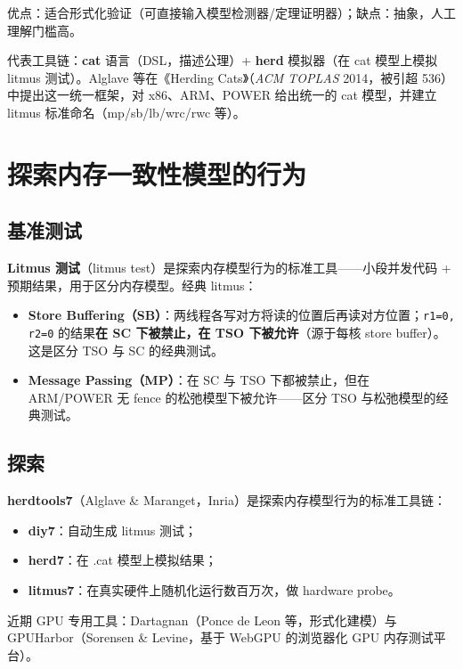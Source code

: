 优点：适合形式化验证（可直接输入模型检测器/定理证明器）；缺点：抽象，人工理解门槛高。

代表工具链：\textbf{cat} 语言（DSL，描述公理）+ \textbf{herd} 模拟器（在 cat 模型上模拟 litmus 测试）。Alglave 等在《Herding Cats》（\emph{ACM TOPLAS} 2014，被引超 536）中提出这一统一框架，对 x86、ARM、POWER 给出统一的 cat 模型，并建立 litmus 标准命名（mp/sb/lb/wrc/rwc 等）。

\section{探索内存一致性模型的行为}

\subsection{基准测试}

\textbf{Litmus 测试}（litmus test）是探索内存模型行为的标准工具——小段并发代码 + 预期结果，用于区分内存模型。经典 litmus：

\begin{itemize}
\item \textbf{Store Buffering（SB）}：两线程各写对方将读的位置后再读对方位置；\texttt{r1=0, r2=0} 的结果\textbf{在 SC 下被禁止，在 TSO 下被允许}（源于每核 store buffer）。这是区分 TSO 与 SC 的经典测试。
\item \textbf{Message Passing（MP）}：在 SC 与 TSO 下都被禁止，但在 ARM/POWER 无 fence 的松弛模型下被允许——区分 TSO 与松弛模型的经典测试。
\end{itemize}


\subsection{探索}

\textbf{herdtools7}（Alglave \& Maranget，Inria）是探索内存模型行为的标准工具链：

\begin{itemize}
\item \textbf{diy7}：自动生成 litmus 测试；
\item \textbf{herd7}：在 .cat 模型上模拟结果；
\item \textbf{litmus7}：在真实硬件上随机化运行数百万次，做 hardware probe。
\end{itemize}


近期 GPU 专用工具：Dartagnan（Ponce de Leon 等，形式化建模）与 GPUHarbor（Sorensen \& Levine，基于 WebGPU 的浏览器化 GPU 内存测试平台）。

